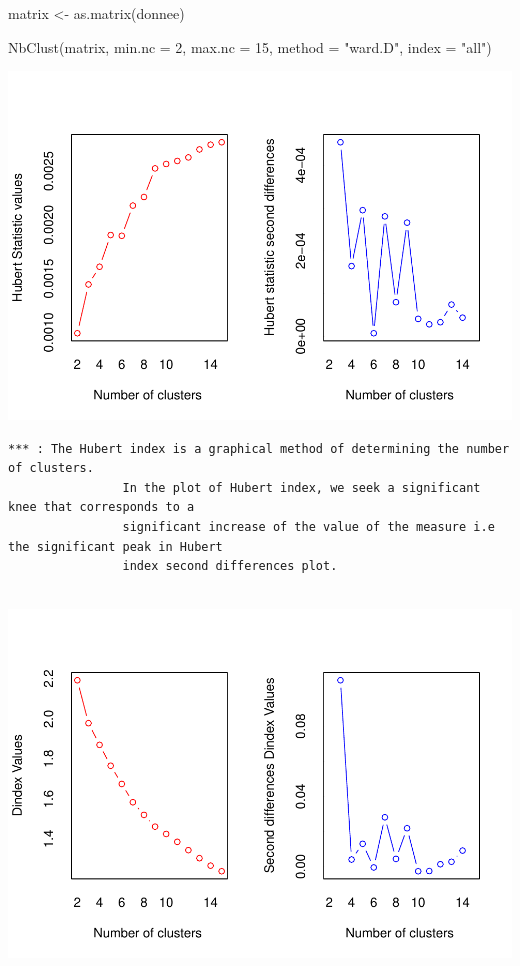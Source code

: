 \documentclass[
]{article}
\newenvironment{Shaded}{}{}
\newcommand{\AttributeTok}[1]{#1}
\newcommand{\DecValTok}[1]{#1}
\newcommand{\FunctionTok}[1]{#1}
\newcommand{\NormalTok}[1]{#1}
\newcommand{\OtherTok}[1]{\textcolor[rgb]{1.00,0.25,0.00}{#1}}
\newcommand{\StringTok}[1]{\textcolor[rgb]{0.00,0.50,0.50}{#1}}
\begin{document}
\begin{Shaded}
\begin{Highlighting}[]
\NormalTok{matrix }\OtherTok{\textless{}{-}} \FunctionTok{as.matrix}\NormalTok{(donnee)}
\end{Highlighting}
\end{Shaded}

\begin{Shaded}
\begin{Highlighting}[]
\FunctionTok{NbClust}\NormalTok{(matrix, }\AttributeTok{min.nc =} \DecValTok{2}\NormalTok{, }\AttributeTok{max.nc =} \DecValTok{15}\NormalTok{, }\AttributeTok{method =} \StringTok{"ward.D"}\NormalTok{, }\AttributeTok{index =} \StringTok{"all"}\NormalTok{)}
\end{Highlighting}
\end{Shaded}

\includegraphics{Projet_files/figure-latex/unnamed-chunk-19-1.pdf}

\begin{verbatim}
*** : The Hubert index is a graphical method of determining the number of clusters.
                In the plot of Hubert index, we seek a significant knee that corresponds to a 
                significant increase of the value of the measure i.e the significant peak in Hubert
                index second differences plot. 
 
\end{verbatim}

\includegraphics{Projet_files/figure-latex/unnamed-chunk-19-2.pdf}
\end{document}
